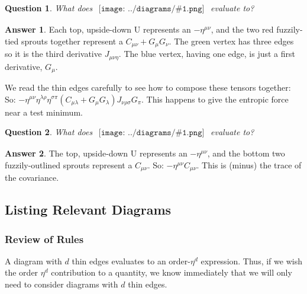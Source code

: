 \documentclass{article}
\theoremstyle{plain}
\newtheorem*{quest*}{Question}
\theoremstyle{definition}
\newtheorem*{answ*}{Answer}
\newcommand{\sdia}[1]{\begin{gathered}\texttt{[image: ../diagrams/\#1.png]}\end{gathered}}
\begin{document}
            \begin{quest*}
                What does $\sdia{(01-2-3)(02-12-23)}$ evaluate to?
            \end{quest*}
            \begin{answ*}
                Each top, upside-down U represents an $-\eta^{\mu\nu}$, and
                the two red fuzzily-tied sprouts together represent a
                $ C_{\mu\nu}+G_\mu G_\nu$.  The green vertex has three edges
                so it is the third derivative $J_{\mu\nu\eta}$.  The blue vertex,
                having one edge, is just a first derivative, $G_{\mu}$.

                We read the thin edges carefully to see how to compose these
                tensors together:
                So:
                $
                    -\eta^{\mu\nu}
                     \eta^{\lambda\rho}
                     \eta^{\sigma\pi}
                     (C_{\mu\lambda} + G_\mu G_\lambda)
                     J_{\nu\rho\sigma}
                     G_\pi
                $.
                This happens to give the entropic force near a test minimum.
            \end{answ*}

            \begin{quest*}
                What does $\sdia{c(01)(01)}$ evaluate to?
            \end{quest*}
            \begin{answ*}
                The top, upside-down U represents an $-\eta^{\mu\nu}$, and
                the bottom two fuzzily-outlined sprouts represent a
                $ C_{\mu\nu}$.  So: $-\eta^{\mu\nu} C_{\mu\nu}$.  This is
                (minus) the trace of the covariance.
            \end{answ*}


    \subsection{Listing Relevant Diagrams}

        \subsubsection*{Review of Rules}
            A diagram with $d$ thin edges evaluates to an order-$\eta^d$
            expression.  Thus, if we wish the order $\eta^d$ contribution to a
            quantity, we know immediately that we will only need to consider
            diagrams with $d$ thin edges.
\end{document}
